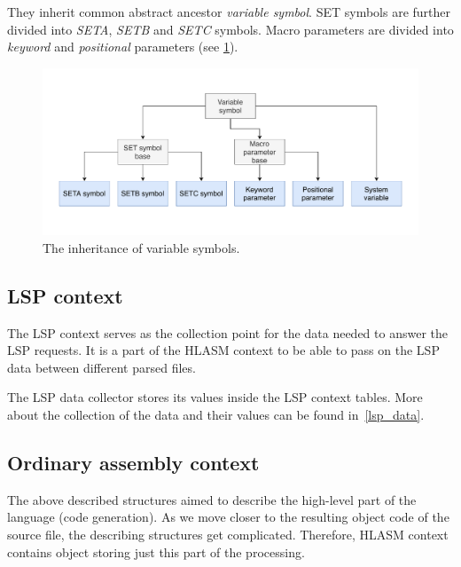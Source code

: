They inherit common abstract ancestor \emph{variable symbol}. SET symbols are further divided into \emph{SETA}, \emph{SETB} and \emph{SETC} symbols. Macro parameters are divided into \emph{keyword} and \emph{positional} parameters (see \cref{fig06:var}).

\begin{figure}
	\centering
	\includegraphics[width=\textwidth]{img/variable_arch}
	\caption{The inheritance of variable symbols.}
	\label{fig06:var}
\end{figure}

\subsection{LSP context}

The LSP context serves as the collection point for the data needed to answer the LSP requests. It is a part of the HLASM context to be able to pass on the LSP data between different parsed files.

The LSP data collector stores its values inside the LSP context tables. More about the collection of the data and their values can be found in~\cref{lsp_data}.

\subsection{Ordinary assembly context}

The above described structures aimed to describe the high-level part of the language (code generation). As we move closer to the resulting object code of the source file, the describing structures get complicated. Therefore, HLASM context contains object storing just this part of the processing.

